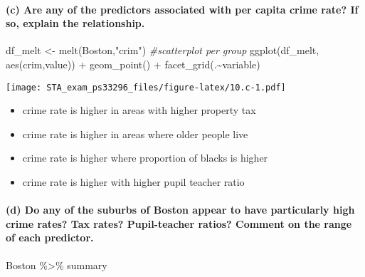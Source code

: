 \documentclass[
]{article}
\newenvironment{Shaded}{\begin{snugshade}}{\end{snugshade}}
\newcommand{\CommentTok}[1]{\textcolor[rgb]{0.56,0.35,0.01}{\textit{#1}}}
\newcommand{\FunctionTok}[1]{\textcolor[rgb]{0.00,0.00,0.00}{#1}}
\newcommand{\NormalTok}[1]{#1}
\newcommand{\OtherTok}[1]{\textcolor[rgb]{0.56,0.35,0.01}{#1}}
\newcommand{\SpecialCharTok}[1]{\textcolor[rgb]{0.00,0.00,0.00}{#1}}
\newcommand{\StringTok}[1]{\textcolor[rgb]{0.31,0.60,0.02}{#1}}
\providecommand{\tightlist}{%
  \setlength{\itemsep}{0pt}\setlength{\parskip}{0pt}}
\begin{document}
\hypertarget{c-are-any-of-the-predictors-associated-with-per-capita-crime-rate-if-so-explain-the-relationship.}{%
\paragraph{(c) Are any of the predictors associated with per capita
crime rate? If so, explain the
relationship.}\label{c-are-any-of-the-predictors-associated-with-per-capita-crime-rate-if-so-explain-the-relationship.}}

\begin{Shaded}
\begin{Highlighting}[]
\NormalTok{df\_melt }\OtherTok{\textless{}{-}} \FunctionTok{melt}\NormalTok{(Boston,}\StringTok{"crim"}\NormalTok{)}
\CommentTok{\#scatterplot per group}
\FunctionTok{ggplot}\NormalTok{(df\_melt, }\FunctionTok{aes}\NormalTok{(crim,value)) }\SpecialCharTok{+}
  \FunctionTok{geom\_point}\NormalTok{() }\SpecialCharTok{+}
  \FunctionTok{facet\_grid}\NormalTok{(.}\SpecialCharTok{\textasciitilde{}}\NormalTok{variable)}
\end{Highlighting}
\end{Shaded}

\texttt{[image: STA\_exam\_ps33296\_files/figure-latex/10.c-1.pdf]}

\begin{itemize}
\tightlist
\item
  crime rate is higher in areas with higher property tax
\item
  crime rate is higher in areas where older people live
\item
  crime rate is higher where proportion of blacks is higher
\item
  crime rate is higher with higher pupil teacher ratio
\end{itemize}

\hypertarget{d-do-any-of-the-suburbs-of-boston-appear-to-have-particularly-high-crime-rates-tax-rates-pupil-teacher-ratios-comment-on-the-range-of-each-predictor.}{%
\paragraph{(d) Do any of the suburbs of Boston appear to have
particularly high crime rates? Tax rates? Pupil-teacher ratios? Comment
on the range of each
predictor.}\label{d-do-any-of-the-suburbs-of-boston-appear-to-have-particularly-high-crime-rates-tax-rates-pupil-teacher-ratios-comment-on-the-range-of-each-predictor.}}

\begin{Shaded}
\begin{Highlighting}[]
\NormalTok{Boston }\SpecialCharTok{\%\textgreater{}\%}\NormalTok{ summary}
\end{Highlighting}
\end{Shaded}
\end{document}
